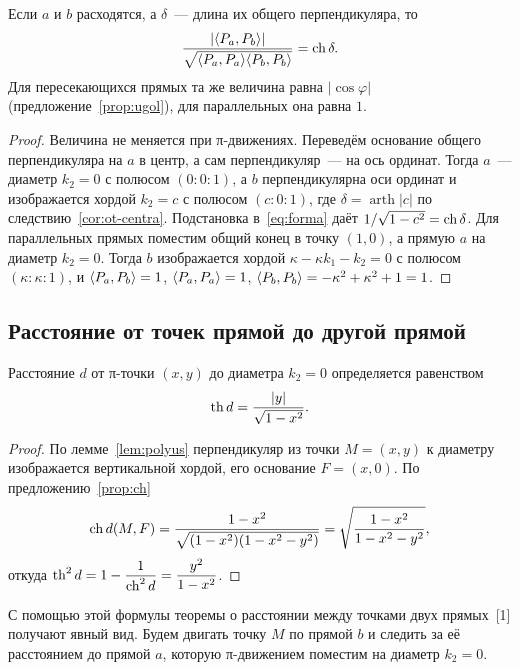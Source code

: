 \begin{proposition}\label{prop:ch-rasstoyaniya}
Если $a$ и $b$ расходятся, а $\delta$~--- длина их общего перпендикуляра, то
\[
\frac{|\langle P_a,P_b\rangle|}{\sqrt{\langle P_a,P_a\rangle\langle P_b,P_b\rangle}}=\operatorname{ch}\delta.
\]
Для пересекающихся прямых та же величина равна $|\cos\varphi|$ (предложение~\ref{prop:ugol}), для параллельных она равна $1$.
\end{proposition}
\begin{proof}
Величина не меняется при π-движениях. Переведём основание общего перпендикуляра на $a$ в центр, а сам перпендикуляр~--- на ось ординат. Тогда $a$~--- диаметр $k_2=0$ с полюсом $(0:0:1)$, а $b$ перпендикулярна оси ординат и изображается хордой $k_2=c$ с полюсом $(c:0:1)$, где $\delta=\operatorname{arth}|c|$ по следствию~\ref{cor:ot-centra}. Подстановка в~\eqref{eq:forma} даёт $1/\sqrt{1-c^2}=\operatorname{ch}\delta$. Для параллельных прямых поместим общий конец в точку $(1,0)$, а прямую $a$ на диаметр $k_2=0$. Тогда $b$ изображается хордой $\kappa-\kappa k_1-k_2=0$ с полюсом $(\kappa:\kappa:1)$, и $\langle P_a,P_b\rangle=1$, $\langle P_a,P_a\rangle=1$, $\langle P_b,P_b\rangle=-\kappa^2+\kappa^2+1=1$.
\end{proof}

\subsection{Расстояние от точек прямой до другой прямой}

\begin{proposition}\label{prop:do-diametra}
Расстояние $d$ от π-точки $(x,y)$ до диаметра $k_2=0$ определяется равенством
\begin{equation}\label{eq:do-diametra}
\operatorname{th} d=\frac{|y|}{\sqrt{1-x^2}}.
\end{equation}
\end{proposition}
\begin{proof}
По лемме~\ref{lem:polyus} перпендикуляр из точки $M=(x,y)$ к диаметру изображается вертикальной хордой, его основание $F=(x,0)$. По предложению~\ref{prop:ch}
\[
\operatorname{ch} d(M,F)=\frac{1-x^2}{\sqrt{(1-x^2)(1-x^2-y^2)}}=\sqrt{\frac{1-x^2}{1-x^2-y^2}},
\]
откуда $\operatorname{th}^2d=1-\dfrac{1}{\operatorname{ch}^2d}=\dfrac{y^2}{1-x^2}$.
\end{proof}

С помощью этой формулы теоремы о расстоянии между точками двух прямых~[1] получают явный вид. Будем двигать точку $M$ по прямой $b$ и следить за её расстоянием до прямой $a$, которую π-движением поместим на диаметр $k_2=0$.

